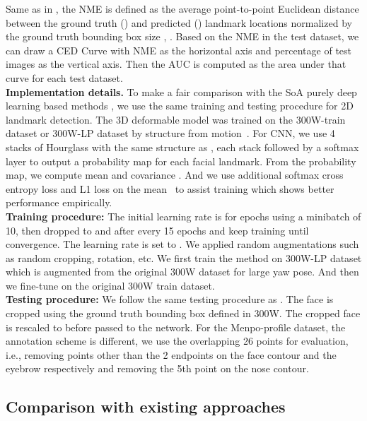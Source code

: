 \documentclass{article}
\begin{document}
Same as in \cite{Bulat17FAN}, the NME is defined as the average point-to-point Euclidean distance between the ground truth () and predicted () landmark locations normalized by the ground truth bounding box size , .
Based on the NME in the test dataset, we can draw a CED Curve with NME as the horizontal axis and percentage of test images as the vertical axis. Then the AUC is computed as the area under that curve for each test dataset.\\
\textbf{Implementation details.} 
  To make a fair comparison with the SoA purely deep learning based methods \cite{Bulat17FAN}, we use the same training and testing procedure for 2D landmark detection. The 3D deformable model was trained on the 300W-train dataset or 300W-LP dataset by structure from motion~\cite{structure_from_motion}. For CNN, we use 4 stacks of Hourglass with the same structure as \cite{Bulat17FAN}, each stack followed by a softmax layer to output a probability map for each facial landmark. From the probability map, we compute mean  and covariance . And we use additional softmax cross entropy loss and L1 loss on the mean~\cite{sun17integral} to assist training which shows better performance empirically. \\
  \textbf{Training procedure:} The initial learning rate  is  for  epochs using a minibatch of 10, then dropped to  and  after every 15 epochs and keep training until convergence. The learning rate  is set to . We applied random augmentations such as random cropping, rotation, etc. We first train the method on 300W-LP \cite{zhu17_3DDFA_300WLP} dataset which is augmented from the original 300W dataset for large yaw pose. And then we fine-tune on the original 300W train dataset. \\
  \textbf{Testing procedure:} We follow the same testing procedure as \cite{Bulat17FAN}. The face is cropped using the ground truth bounding box defined in 300W. The cropped face is rescaled to  before passed to the network. For the Menpo-profile dataset, the annotation scheme is different, we use the overlapping 26 points for evaluation, i.e., removing points other than the 2 endpoints on the face contour and the eyebrow respectively and removing the 5th point on the nose contour.

\subsection{Comparison with existing approaches} \label{sub:prediction_accuracy}
\end{document}
